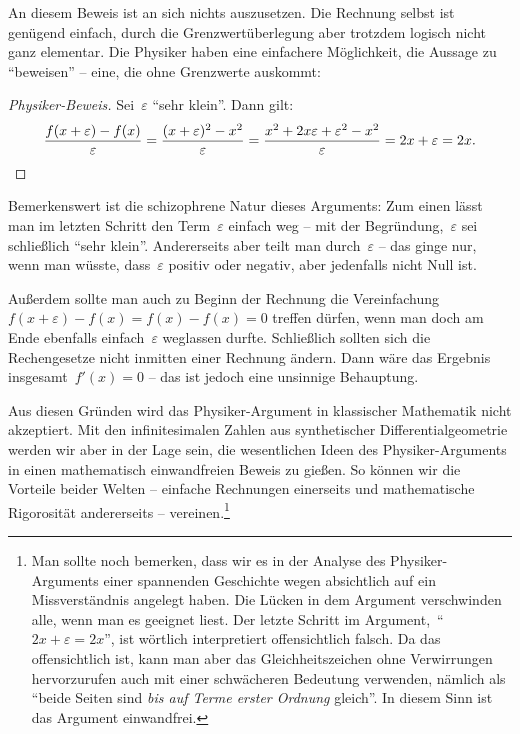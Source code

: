 \documentclass[twoside]{../zirkelblatt}
\theoremstyle{definition}
\theoremstyle{plain}
\theoremstyle{remark}
\begin{document}
An diesem Beweis ist an sich nichts auszusetzen. Die Rechnung selbst ist genügend
einfach, durch die Grenzwertüberlegung aber trotzdem logisch nicht ganz
elementar. Die Physiker haben eine einfachere Möglichkeit, die Aussage zu
"`beweisen"' -- eine, die ohne Grenzwerte auskommt:

\begin{proof}[Physiker-Beweis]Sei~$\varepsilon$ "`sehr klein"'. Dann gilt:
\[ \frac{f(x + \varepsilon) - f(x)}{\varepsilon} =
  \frac{(x + \varepsilon)^2 - x^2}{\varepsilon} =
  \frac{x^2 + 2x\varepsilon + \varepsilon^2 - x^2}{\varepsilon} =
  2x + \varepsilon = 2x. \qedhere \]
\end{proof}

\label{par:schizophren}Bemerkenswert ist die schizophrene Natur dieses Arguments:
Zum einen lässt man im letzten Schritt den Term~$\varepsilon$ einfach weg --
mit der Begründung,~$\varepsilon$ sei schließlich "`sehr klein"'. Andererseits
aber teilt man durch~$\varepsilon$ -- das ginge nur, wenn man wüsste,
dass~$\varepsilon$ positiv oder negativ, aber jedenfalls nicht Null ist.

Außerdem sollte man auch zu Beginn der Rechnung die Vereinfachung~$f(x +
\varepsilon) - f(x) = f(x) - f(x) = 0$ treffen dürfen, wenn man doch am Ende
ebenfalls einfach~$\varepsilon$ weglassen durfte. Schließlich sollten sich die
Rechengesetze nicht inmitten einer Rechnung ändern. Dann wäre das Ergebnis
insgesamt~$f'(x) = 0$ -- das ist jedoch eine unsinnige Behauptung.

Aus diesen Gründen wird das Physiker-Argument in klassischer Mathematik
nicht akzeptiert. Mit den infinitesimalen Zahlen aus synthetischer
Differentialgeometrie werden wir aber in der Lage sein, die wesentlichen Ideen des
Physiker-Arguments in einen mathematisch einwandfreien Beweis zu gießen. So
können wir die Vorteile beider Welten -- einfache Rechnungen einerseits und
mathematische Rigorosität andererseits -- vereinen.\footnote{Man sollte noch
bemerken, dass wir es in der Analyse des Physiker-Arguments einer spannenden
Geschichte wegen absichtlich auf ein
Missverständnis angelegt haben. Die Lücken in dem Argument verschwinden alle,
wenn man es geeignet liest. Der letzte Schritt im Argument,~"`$2x + \varepsilon =
2x$"', ist wörtlich interpretiert offensichtlich falsch. Da das offensichtlich ist,
kann man aber das Gleichheitszeichen ohne Verwirrungen hervorzurufen auch
mit einer schwächeren Bedeutung verwenden, nämlich als "`beide Seiten sind \emph{bis auf
Terme erster Ordnung} gleich"'. In diesem Sinn ist das Argument einwandfrei.}
\end{document}
